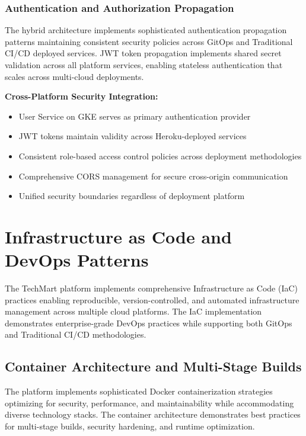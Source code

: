 \subsubsection{Authentication and Authorization Propagation}

The hybrid architecture implements sophisticated authentication propagation patterns maintaining consistent security policies across GitOps and Traditional CI/CD deployed services. JWT token propagation implements shared secret validation across all platform services, enabling stateless authentication that scales across multi-cloud deployments.

\textbf{Cross-Platform Security Integration:}
\begin{itemize}
\item User Service on GKE serves as primary authentication provider
\item JWT tokens maintain validity across Heroku-deployed services
\item Consistent role-based access control policies across deployment methodologies
\item Comprehensive CORS management for secure cross-origin communication
\item Unified security boundaries regardless of deployment platform
\end{itemize}

\section{Infrastructure as Code and DevOps Patterns}

The TechMart platform implements comprehensive Infrastructure as Code (IaC) practices enabling reproducible, version-controlled, and automated infrastructure management across multiple cloud platforms. The IaC implementation demonstrates enterprise-grade DevOps practices while supporting both GitOps and Traditional CI/CD methodologies.

\subsection{Container Architecture and Multi-Stage Builds}

The platform implements sophisticated Docker containerization strategies optimizing for security, performance, and maintainability while accommodating diverse technology stacks. The container architecture demonstrates best practices for multi-stage builds, security hardening, and runtime optimization.

